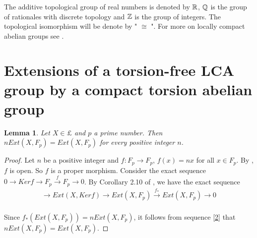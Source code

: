 \documentclass{amsart}
\newtheorem{lem}[thm]{Lemma}
\theoremstyle{definition}
\theoremstyle{remark}
\numberwithin{equation}{section}
\begin{document}
 The additive topological group of real numbers is denoted by $\Bbb R$, $\Bbb Q$ is the group of rationales with discrete topology and $\Bbb Z$ is the group of integers. The topological isomorphism will be denote by " $\cong$ ". For more on locally compact abelian groups see \cite{HR}.

\section{Extensions of a torsion-free LCA group by a compact torsion abelian group}
\begin{lem}\label{1}
Let $X\in\pounds$ and $p$ a prime number. Then $nExt(X,F_{p})=Ext(X,F_{p})$ for every positive integer $n$.
\end{lem}
\begin{proof}
Let $n$ be a positive integer and $f:F_{p}\to F_{p}$, $f(x)=nx$ for all $x\in F_{p}$. By \cite[Lemma 2]{A}, $f$ is open. So $f$ is a proper morphism. Consider the exact sequence $0\to Ker f\to F_{p}{\stackrel{{f}}{\longrightarrow}} F_{p}\to 0$. By Corollary 2.10 of \cite{FG1}, we have the exact sequence
\begin{eqnarray}\label{2}
\to Ext(X,Ker f)\to Ext (X,F_{p}){\stackrel{{f_{*}}}{\longrightarrow}} Ext (X,F_{p})\to 0
\end{eqnarray}\\
Since $f_* (Ext(X,F_{p}))=n Ext(X,F_{p})$, it follows from sequence \eqref{2} that $nExt(X,F_{p})=Ext(X,F_{p})$.
\end{proof}
\end{document}
